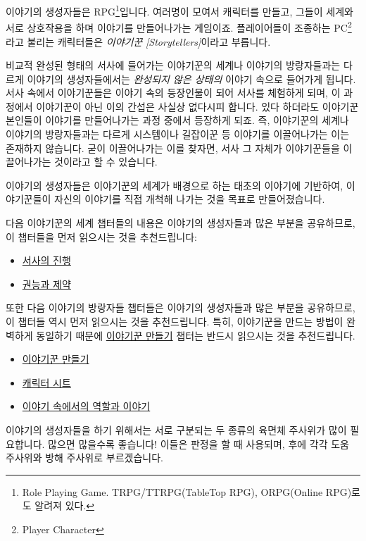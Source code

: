 \documentclass{report}
\begin{document}
	이야기의 생성자들은 RPG\footnote{Role Playing Game. TRPG/TTRPG(TableTop RPG), ORPG(Online RPG)로도 알려져 있다.}입니다. 여러명이 모여서 캐릭터를 만들고, 그들이 세계와 서로 상호작용을 하며 이야기를 만들어나가는 게임이죠. 플레이어들이 조종하는 PC\footnote{Player Character}라고 불리는 캐릭터들은 \emph{이야기꾼} \emph{[Storytellers]}이라고 부릅니다.
	
	비교적 완성된 형태의 서사에 들어가는 이야기꾼의 세계나 이야기의 방랑자들과는 다르게 이야기의 생성자들에서는 \emph{완성되지 않은 상태의} 이야기 속으로 들어가게 됩니다. 서사 속에서 이야기꾼들은 이야기 속의 등장인물이 되어 서사를 체험하게 되며, 이 과정에서 이야기꾼이 아닌 이의 간섭은 사실상 없다시피 합니다. 있다 하더라도 이야기꾼 본인들이 이야기를 만들어나가는 과정 중에서 등장하게 되죠. 즉, 이야기꾼의 세계나 이야기의 방랑자들과는 다르게 시스템이나 길잡이꾼 등 이야기를 이끌어나가는 이는 존재하지 않습니다. 굳이 이끌어나가는 이를 찾자면, 서사 그 자체가 이야기꾼들을 이끌어나가는 것이라고 할 수 있습니다.
	
	이야기의 생성자들은 이야기꾼의 세계가 배경으로 하는 태초의 이야기에 기반하여, 이야기꾼들이 자신의 이야기를 직접 개척해 나가는 것을 목표로 만들어졌습니다.
	
	다음 이야기꾼의 세계 챕터들의 내용은 이야기의 생성자들과 많은 부분을 공유하므로, 이 챕터들을 먼저 읽으시는 것을 추천드립니다:
	\begin{itemize}
		\item \hyperlink{story-progression}{서사의 진행}
		\item \hyperlink{power-limit}{권능과 제약}
	\end{itemize}
	
	또한 다음 이야기의 방랑자들 챕터들은 이야기의 생성자들과 많은 부분을 공유하므로, 이 챕터들 역시 먼저 읽으시는 것을 추천드립니다. 특히, 이야기꾼을 만드는 방법이 완벽하게 동일하기 때문에 \hyperlink{lite-character-creation}{이야기꾼 만들기} 챕터는 반드시 읽으시는 것을 추천드립니다.
	\begin{itemize}
		\item \hyperlink{lite-character-creation}{이야기꾼 만들기}
		\item \hyperlink{lite-sheets}{캐릭터 시트}
		\item \hyperlink{lite-roles}{이야기 속에서의 역할과 이야기}
	\end{itemize}
	
	이야기의 생성자들을 하기 위해서는 서로 구분되는 두 종류의 육면체 주사위가 많이 필요합니다. 많으면 많을수록 좋습니다! 이들은 판정을 할 때 사용되며, 후에 각각 도움 주사위와 방해 주사위로 부르겠습니다.
\end{document}
